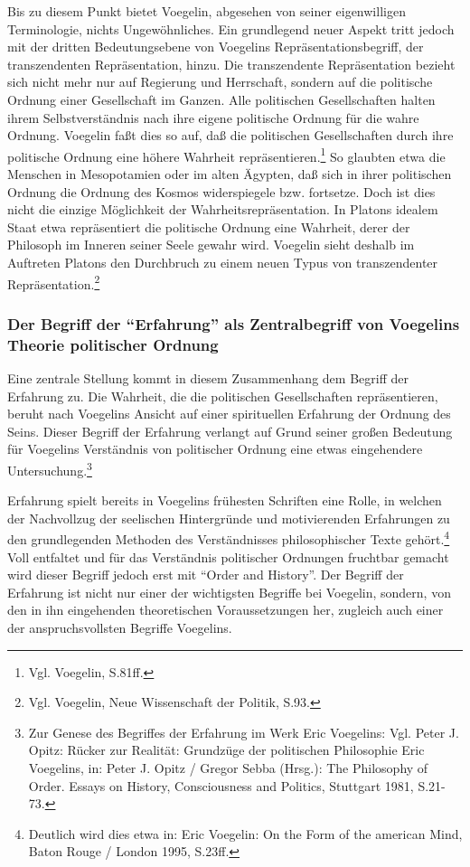 Bis zu diesem Punkt bietet Voegelin, abgesehen von seiner eigenwilligen
Terminologie, nichts Ungewöhnliches. Ein grundlegend neuer Aspekt tritt jedoch
mit der dritten Bedeutungsebene von Voegelins Repräsentationsbegriff, der
transzendenten Repräsentation, hinzu. Die transzendente Repräsentation bezieht
sich nicht mehr nur auf Regierung und Herrschaft, sondern auf die politische
Ordnung einer Gesellschaft im Ganzen. Alle politischen Gesellschaften halten
ihrem Selbstverständnis nach ihre eigene politische Ordnung für die wahre
Ordnung. Voegelin faßt dies so auf, daß die politischen Gesellschaften durch
ihre politische Ordnung eine höhere Wahrheit repräsentieren.\footnote{Vgl.
  Voegelin, S.81ff.} So glaubten etwa die Menschen in Mesopotamien oder im
alten Ägypten, daß sich in ihrer politischen Ordnung die Ordnung des Kosmos
widerspiegele bzw. fortsetze. Doch ist dies nicht die einzige Möglichkeit der
Wahrheitsrepräsentation. In Platons idealem Staat etwa repräsentiert die
politische Ordnung eine Wahrheit, derer der Philosoph im Inneren seiner Seele
gewahr wird. Voegelin sieht deshalb im Auftreten Platons den Durchbruch zu
einem neuen Typus von transzendenter Repräsentation.\footnote{Vgl. Voegelin,
  Neue Wissenschaft der Politik, S.93.}

\subsubsection{Der Begriff der "`Erfahrung"' als Zentralbegriff von Voegelins
  Theorie politischer Ordnung}

Eine zentrale Stellung kommt in diesem Zusammenhang dem Begriff der Erfahrung
zu. Die Wahrheit, die die politischen Gesellschaften repräsentieren, beruht
nach Voegelins Ansicht auf einer spirituellen Erfahrung der Ordnung des Seins.
Dieser Begriff der Erfahrung verlangt auf Grund seiner großen Bedeutung für
Voegelins Verständnis von politischer Ordnung eine etwas eingehendere
Untersuchung.\footnote{Zur Genese des Begriffes der Erfahrung im Werk Eric
  Voegelins: Vgl. Peter J. Opitz: Rücker zur Realität: Grundzüge der
  politischen Philosophie Eric Voegelins, in: Peter J.  Opitz /
  Gregor Sebba (Hrsg.): The Philosophy of Order. Essays on History,
  Consciousness and Politics, Stuttgart 1981, S.21-73.}

Erfahrung spielt bereits in Voegelins frühesten Schriften eine Rolle, in
welchen der Nachvollzug der seelischen Hintergründe und motivierenden
Erfahrungen zu den grundlegenden Methoden des Verständnisses philosophischer
Texte gehört.\footnote{Deutlich wird dies etwa in: Eric Voegelin: On the Form
  of the american Mind, Baton Rouge / London 1995, S.23ff.} Voll entfaltet und
für das Verständnis politischer Ordnungen fruchtbar gemacht wird dieser
Begriff jedoch erst mit "`Order and History"'. Der Begriff der Erfahrung ist
nicht nur einer der wichtigsten Begriffe bei Voegelin, sondern, von den in ihn
eingehenden theoretischen Voraussetzungen her, zugleich auch einer der
anspruchsvollsten Begriffe Voegelins.

